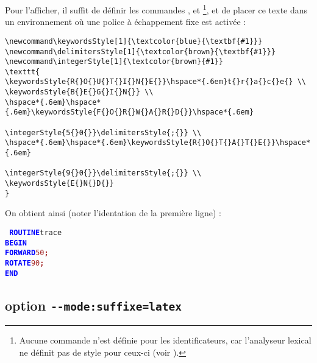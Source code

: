 Pour l'afficher, il suffit de définir les commandes ,  et \footnote{Aucune commande n'est définie pour les identificateurs, car l'analyseur lexical ne définit pas de style pour ceux-ci (voir ).}, et de placer ce texte dans un environnement où une police à échappement fixe est activée :



\begin{verbatim}
\newcommand\keywordsStyle[1]{\textcolor{blue}{\textbf{#1}}}
\newcommand\delimitersStyle[1]{\textcolor{brown}{\textbf{#1}}}
\newcommand\integerStyle[1]{\textcolor{brown}{#1}}
\texttt{
\keywordsStyle{R{}O{}U{}T{}I{}N{}E{}}\hspace*{.6em}t{}r{}a{}c{}e{} \\
\keywordsStyle{B{}E{}G{}I{}N{}} \\
\hspace*{.6em}\hspace*{.6em}\keywordsStyle{F{}O{}R{}W{}A{}R{}D{}}\hspace*{.6em}
                                  \integerStyle{5{}0{}}\delimitersStyle{;{}} \\
\hspace*{.6em}\hspace*{.6em}\keywordsStyle{R{}O{}T{}A{}T{}E{}}\hspace*{.6em}
                                  \integerStyle{9{}0{}}\delimitersStyle{;{}} \\
\keywordsStyle{E{}N{}D{}}
}
\end{verbatim}

On obtient ainsi (noter l'identation de la première ligne) :

\texttt{
\textcolor{blue}{\bf ROUTINE}\hspace*{.6em}t{}r{}a{}c{}e{} \\
\textcolor{blue}{\bf BEGIN} \\
\hspace*{1.2em}\textcolor{blue}{\bf FORWARD}\hspace*{.6em}\textcolor{brown}{5{}0{}}\textcolor{brown}{\bf ;} \\
\hspace*{1.2em}\textcolor{blue}{\bf ROTATE}\hspace*{.6em}\textcolor{brown}{9{}0{}}\textcolor{brown}{\bf ;} \\
\textcolor{blue}{\bf END}
}


\subsection{option \texttt{-{}-mode:suffixe=latex}}

